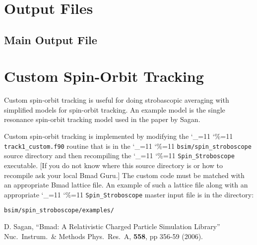 \documentclass[11pt,openany]{report}
\newcommand\dottcmd[1]{\texttt{#1}\endgroup}
\newcommand{\vn}{\begingroup\catcode`\_=11 \catcode`\%=11 \dottcmd}
\newcommand{\sss}{\vn{Spin_Stroboscope}\xspace}
\newlength{\ExBeg}
\newlength{\ExEnd}
\newenvironment{example}
  {\vspace{\ExBeg} \begin{alltt}}
  {\end{alltt} \vspace{\ExEnd}}
\begin{document}
  \begin{description}
  \item
  \end{description}

\chapter{Output Files} 

\section{Main Output File}
\label{s:main.out}

\chapter{Custom Spin-Orbit Tracking}

Custom spin-orbit tracking is useful for doing strobascopic averaging with simplified models for
spin-orbit tracking. An example model is the single resonance spin-orbit tracking model used in the
paper by Sagan. 

Custom spin-orbit tracking is implemented by modifying the \vn{track1_custom.f90} routine that is in
the \vn{bsim/spin_stroboscope} source directory and then recompiling the \sss executable. [If you do
not know where this source directory is or how to recompile ask your local Bmad Guru.] The custom
code must be matched with an appropriate Bmad lattice file. An example of such a lattice file along
with an appropriate \sss master input file is in the directory:
\begin{example}
  bsim/spin_stroboscope/examples/
\end{example}


\begin{thebibliography}{9}

D. Sagan,
``Bmad: A Relativistic Charged Particle Simulation Library''
Nuc.\ Instrum.\ \& Methods Phys.\ Res.\ A, {\bf 558}, pp 356-59 (2006).

\end{thebibliography}
\end{document}
